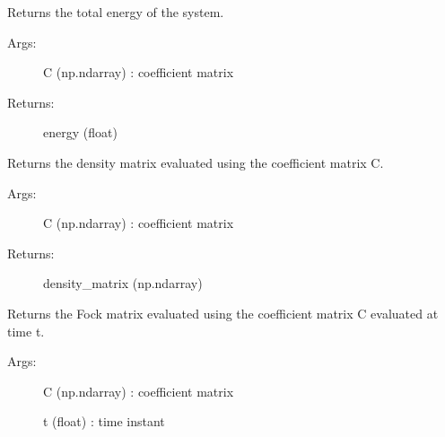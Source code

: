 \documentclass[letterpaper,10pt,english]{sphinxmanual}
\begin{document}
\begin{fulllineitems}

\begin{fulllineitems}
\label{\detokenize{index:do.GHF.evaluate_total_energy}}
Returns the total energy of the system.
\begin{description}
\item[{Args:}] \leavevmode
C (np.ndarray) : coefficient matrix

\item[{Returns:}] \leavevmode
energy (float)

\end{description}

\end{fulllineitems}


\begin{fulllineitems}
\label{\detokenize{index:do.GHF.fill_density_matrix}}
Returns the density matrix evaluated using the coefficient matrix C.
\begin{description}
\item[{Args:}] \leavevmode
C (np.ndarray) : coefficient matrix

\item[{Returns:}] \leavevmode
density\_matrix (np.ndarray)

\end{description}

\end{fulllineitems}


\begin{fulllineitems}
\label{\detokenize{index:do.GHF.fill_fock_matrix}}
Returns the Fock matrix evaluated using the coefficient matrix C evaluated at time t.
\begin{description}
\item[{Args:}] \leavevmode
C (np.ndarray) : coefficient matrix

t (float) : time instant


\end{description}
\end{fulllineitems}
\end{fulllineitems}
\end{document}
